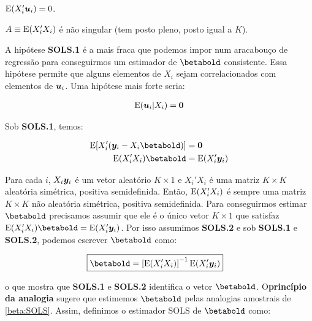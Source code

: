 \documentclass[11pt, oneside, a4paper, article]{article}
\numberwithin{equation}{section}
\begin{document}
\begin{description}[itemsep = 0ex]
\item [SOLS.1] $\text{E}(X_{i}' \boldsymbol{u}_{i}) = 0$.
		
\item [SOLS.2] $A \equiv \text{E}( X_{i}' X_{i} )$ é não singular (tem posto pleno, posto igual a $K$). 
\end{description}

A hipótese \textbf{SOLS.1} é a mais fraca que podemos impor num aracabouço de regressão para conseguirmos um estimador de $\betabold$ consistente.
Essa hipótese permite que alguns elementos de $X_{i}$ sejam correlacionados com elementos de $\boldsymbol{u}_{i}$.
Uma hipótese mais forte seria:

\vspace{-1 em}
\begin{align} \label{cond:mean:0}
	\text{E}(\boldsymbol{u}_{i} | X_{i} ) = \boldsymbol{0}
\end{align}

Sob \textbf{SOLS.1}, temos:

\vspace{-1 em}
\begin{align*} 
\E[ X_{i}' ( \mbs{y}_{i} - X_{i} \betabold ) ] &= \mbs{0}
\\
\E( X_{i}' X_{i} ) \betabold &= \E( X_{i}' \mbs{y}_{i} )  
\end{align*}

Para cada $i$, $X_{i} \boldsymbol{y}_{i}$ é um vetor aleatório $K \times 1$ e $X_{i}'X_{i}$ é uma matriz $K \times K$ aleatória simétrica, positiva semidefinida.
Então, $\text{E}(X_{i}' X_{i})$ é sempre uma matriz $K \times K$ não aleatória simétrica, positiva semidefinida.
Para conseguirmos estimar $\betabold$ precisamos assumir que ele é o único vetor $K \times 1$ que satisfaz $\E( X_{i}' X_{i} ) \betabold = \E( X_{i}' \mbs{y}_{i} )$.
Por isso assumimos \textbf{SOLS.2} e sob \textbf{SOLS.1} e \textbf{SOLS.2}, podemos escrever $\betabold$ como:

\vspace{-1 em}
\begin{align} \label{beta:SOLS}
	\Aboxed{
\betabold &=
\left[ \E( X_{i}' X_{i} )  \right]^{-1}
\E( X_{i}' \mbs{y}_{i} )  }
\end{align}

\noindent
o que mostra que \textbf{SOLS.1} e \textbf{SOLS.2} identifica o vetor $\betabold$.
O\textbf{princípio da analogia} sugere que estimemos $\betabold$ pelas analogias amostrais de \eqref{beta:SOLS}.
Assim, definimos o estimador SOLS de $\betabold$ como:
\end{document}
